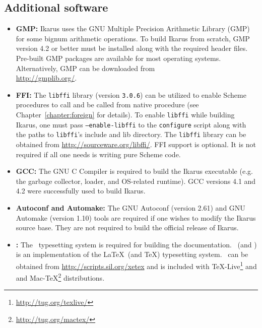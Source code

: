 \documentclass[onecolumn, 12pt, twoside, openright, dvipdfm]{book}
\begin{document}
\subsection{Additional software}

\begin{itemize}
\item\textbf{GMP:} Ikarus uses the GNU Multiple Precision Arithmetic
Library (GMP) for some bignum arithmetic operations.  To build
Ikarus from scratch, GMP version 4.2 or better must be installed
along with the required header files.  Pre-built GMP packages  are
available for most operating systems.  Alternatively, GMP can be
downloaded from \\
\url{http://gmplib.org/}.


\item\textbf{FFI:} 
 The \texttt{libffi} library (version \texttt{3.0.6}) can be utilized 
to enable Scheme procedures to call and be called from native
procedure (see Chapter~\ref{chapter:foreign} for details).  
To enable
\texttt{libffi} while building Ikarus, one must pass
\texttt{--enable-libffi} to the \texttt{configure} script along with
the paths to \texttt{libffi}'s include and lib directory.
The \texttt{libffi} library can be obtained from
\url{http://sourceware.org/libffi/}.
FFI support is optional.  It is not required if all one needs is
writing pure Scheme code.




\item\textbf{GCC:} The GNU C Compiler is required to build the Ikarus
executable (e.g. the garbage collector, loader, and OS-related
runtime).  GCC versions 4.1 and 4.2 were successfully used to build
Ikarus.

\item\textbf{Autoconf and Automake:} The GNU Autoconf (version 2.61)
and GNU Automake (version 1.10) tools are required if one
wishes to modify the Ikarus source base.  They are not
required to build the official release of Ikarus.

\item\textbf{\XeLaTeX{}:}  The \XeLaTeX\ typesetting system is
required for building the documentation.  \XeLaTeX\ (and \XeTeX) is
an implementation of the \LaTeX\ (and \TeX) typesetting system.
\XeLaTeX\ can be obtained from \url{http://scripts.sil.org/xetex}
and is included with \TeX-Live\footnote{
\url{http://tug.org/texlive/}} and and
Mac-\TeX\footnote{\url{http://tug.org/mactex/}} distributions.


\end{itemize}
\end{document}

